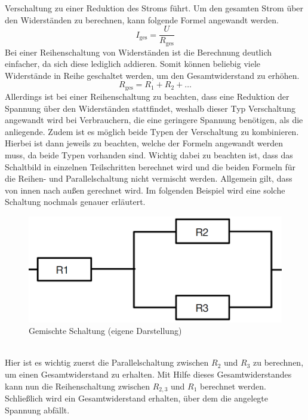 Verschaltung zu einer Reduktion des Stroms führt. Um den gesamten Strom über den Widerständen zu berechnen, kann folgende Formel angewandt werden.
\begin{equation}
I_{\text{ges}} = \frac{U}{R_{\text{ges}}}
\label{eqn:Gesamtstrom Parallelschaltung}
\end{equation}
Bei einer Reihenschaltung von Widerständen ist die Berechnung deutlich einfacher, da sich diese lediglich addieren. Somit können beliebig viele Widerstände in 
Reihe geschaltet werden, um den Gesamtwiderstand zu erhöhen.
\begin{equation}
R_{\text{ges}}=R_1+R_2+\dots
\label{eqn:Widerstand Reihenschaltung}
\end{equation}
Allerdings ist bei einer Reihenschaltung zu beachten, dass eine Reduktion der Spannung über den Widerständen stattfindet, weshalb dieser Typ Verschaltung 
angewandt wird bei Verbrauchern, die eine geringere Spannung benötigen, als die anliegende. Zudem ist es möglich beide Typen der Verschaltung zu kombinieren. 
Hierbei ist dann jeweils zu beachten, welche der Formeln angewandt werden muss, da beide Typen vorhanden sind. Wichtig dabei zu beachten ist, dass das 
Schaltbild in einzelnen Teilschritten berechnet wird und die beiden Formeln für die Reihen- und Parallelschaltung nicht vermischt werden.
Allgemein gilt, dass von innen nach außen gerechnet wird. Im folgenden Beispiel wird eine solche Schaltung nochmals genauer erläutert.
\begin{figure}[hbt]
    \centering
    \includegraphics[width=0.8\linewidth]{images/Gemischte Schaltung}
    \caption[Gemischte Schaltung]{Gemischte Schaltung (eigene Darstellung)}
    \label{fig:Gemischte Schaltung}
\end{figure}
\\Hier ist es wichtig zuerst die Parallelschaltung zwischen $R_2$ und $R_3$ zu berechnen, um einen Gesamtwiderstand zu erhalten. Mit Hilfe dieses 
Gesamtwiderstandes kann nun die Reihenschaltung zwischen $R_{2,3}$ und $R_1$ berechnet werden. Schließlich wird ein Gesamtwiderstand erhalten,
über dem die angelegte Spannung abfällt. \autocite{Weigerber.2018}
